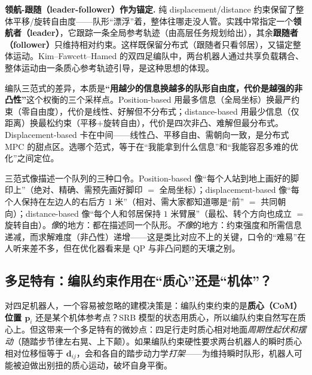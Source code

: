 \textbf{领航-跟随（leader-follower）作为锚定.} 纯 displacement/distance 约束保留了整体平移/旋转自由度——队形“漂浮”着，整体往哪走没人管。实践中常指定一个\textbf{领航者（leader）}，它跟踪一条全局参考轨迹（由高层任务规划给出），其余\textbf{跟随者（follower）}只维持相对约束。这样既保留分布式（跟随者只看邻居），又锚定整体运动。Kim--Fawcett--Hamed\cite{kim2023layered} 的双四足编队中，两台机器人通过共享负载耦合、整体运动由一条质心参考轨迹引导，是这种思想的体现。

\begin{insight}[三范式 $=$ “信息 vs 自由度 vs 非凸性”权衡的三个采样点]\label{ins:dmpc-three-tradeoff}
编队三范式的差异，本质是\textbf{“用越少的信息换越多的队形自由度，代价是越强的非凸性”}这个权衡的三个采样点。Position-based 用最多信息（全局坐标）换最严约束（零自由度），代价是线性、好解但不分布式；distance-based 用最少信息（仅距离）换最松约束（平移$+$旋转自由），代价是四次非凸、难解但最分布式。Displacement-based 卡在中间——线性凸、平移自由、需朝向一致，是分布式 MPC 的甜点区。选哪个范式，等于在“我能拿到什么信息”和“我能容忍多难的优化”之间定位。
\end{insight}

\begin{insight}\label{ins:dmpc-formation-commands}
三范式像描述一个队列的三种口令。Position-based 像“每个人站到地上画好的脚印上”（绝对、精确、需预先画好脚印 $=$ 全局坐标）；displacement-based 像“每个人保持在左边人的右后方 $1$ 米”（相对、需大家都知道哪是“前” $=$ 共同朝向）；distance-based 像“每个人和邻居保持 $1$ 米臂展”（最松、转个方向也成立 $=$ 旋转自由）。\emph{像}的地方：都在描述同一个队形。\emph{不像}的地方：约束强度和所需信息递减，而求解难度（非凸性）递增——这是类比对应不上的关键，口令的“难易”在人听来差不多，但在优化器看来是 QP 与非凸问题的天壤之别。
\end{insight}

\subsection{多足特有：编队约束作用在“质心”还是“机体”？}
\label{sec:dmpc-com-vs-body}

对四足机器人，一个容易被忽略的建模决策是：编队约束约束的是\textbf{质心（CoM）位置 $\mathbf{p}_i$} 还是某个机体参考点？SRB 模型的状态用质心，所以编队约束自然写在质心上。但这带来一个多足特有的微妙点：四足行走时质心相对地面\emph{周期性起伏和摆动}（随踏步节律左右晃、上下颠）。如果编队约束硬性要求两台机器人的瞬时质心相对位移恒等于 $\mathbf{d}_{ij}$，会和各自的踏步动力学\emph{打架}——为维持瞬时队形，机器人可能被迫做出别扭的质心运动，破坏自身平衡。

